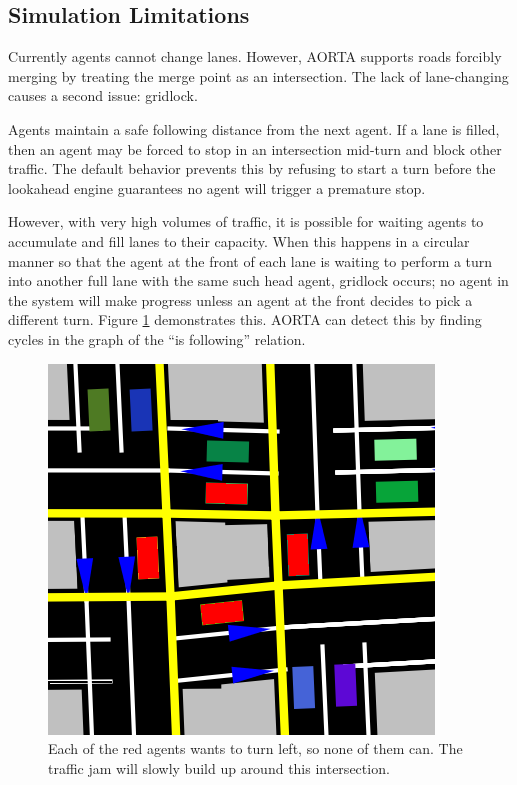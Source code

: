 \documentclass[letterpaper, 10 pt, conference]{ieeeconf}  %
\begin{document}
\subsection{Simulation Limitations}

Currently agents cannot change lanes. However, AORTA supports roads forcibly
merging by treating the merge point as an intersection. The lack of
lane-changing causes a second issue: gridlock.

Agents maintain a safe following distance from the next agent. If a lane is
filled, then an agent may be forced to stop in an intersection mid-turn and
block other traffic. The default behavior prevents this by refusing to start a
turn before the lookahead engine guarantees no agent will trigger a premature
stop.

However, with very high volumes of traffic, it is possible for waiting agents to
accumulate and fill lanes to their capacity. When this happens in a circular
manner so that the agent at the front of each lane is waiting to perform a turn
into another full lane with the same such head agent, gridlock \cite{gridlock}
occurs; no agent in the system will make progress unless an agent at the front
decides to pick a different turn. Figure \ref{fig:gridlock} demonstrates this.
AORTA can detect this by finding cycles in the graph of the ``is following''
relation.

\begin{figure}[h]
  \centering \includegraphics[scale=0.25]{gridlock.png}
  \caption{Each of the red agents wants to turn left, so none of them
           can. The traffic jam will slowly build up around this intersection.}
  \label{fig:gridlock}
  \vspace{-10pt}
\end{figure}
\end{document}

